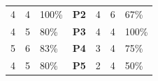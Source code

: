 \begin{table}[]
\begin{tabular}{rrlcrrl}
\rowcolor{yellow}
4                                                                                             & 4                                                                                          & 100\%                                                                                   & \textbf{P2}                              & 4                                                                                             & 6                                                                                          & 67\%                                                                                     \\
4                                                                                             & 5                                                                                          & 80\%                                                                                    & \textbf{P3}                              & 4                                                                                             & 4                                                                                          & 100\%                                                                                    \\
\rowcolor{yellow}
5                                                                                             & 6                                                                                          & 83\%                                                                                    & \textbf{P4}                              & 3                                                                                             & 4                                                                                          & 75\%                                                                                     \\
\rowcolor{yellow}
4                                                                                             & 5                                                                                          & 80\%                                                                                    & \textbf{P5}                              & 2                                                                                             & 4                                                                                          & 50\%                                                                                     \\

\end{tabular}
\end{table}
